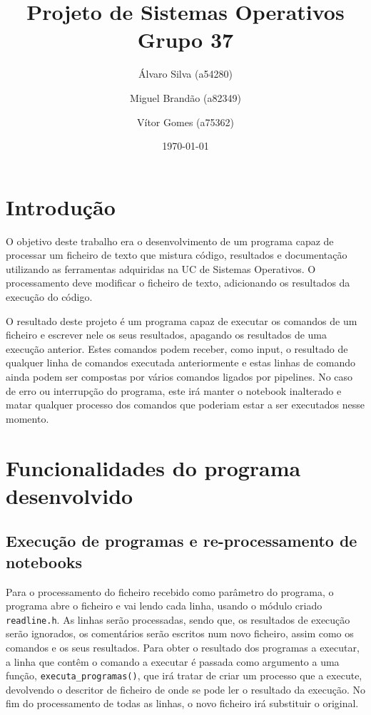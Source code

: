 \documentclass[a4paper]{article}
\title{Projeto de Sistemas Operativos\\Grupo 37}
\author{Álvaro Silva (a54280) \and Miguel Brandão (a82349) \and Vítor Gomes (a75362)}
\date{\today}
\begin{document}
\maketitle


\tableofcontents

\section{Introdução}
\label{sec:intro}

O objetivo deste trabalho era o desenvolvimento de um programa capaz de processar um ficheiro de texto que mistura código, resultados e documentação utilizando as ferramentas adquiridas na UC de Sistemas Operativos. O processamento deve modificar o ficheiro de texto, adicionando os resultados da execução do código.

O resultado deste projeto é um programa capaz de executar os comandos de um ficheiro e escrever nele os seus resultados, apagando os resultados de uma execução anterior. Estes comandos podem receber, como input, o resultado de qualquer linha de comandos executada anteriormente e estas linhas de comando ainda podem ser compostas por vários comandos ligados por pipelines. No caso de erro ou interrupção do programa, este irá manter o notebook inalterado e matar qualquer processo dos comandos que poderiam estar a ser executados nesse momento.

\section{Funcionalidades do programa desenvolvido}
\label{sec:func}


\subsection{Execução de programas e re-processamento de notebooks}

Para o processamento do ficheiro recebido como parâmetro do programa, o programa abre o ficheiro e vai lendo cada linha, usando o módulo criado \texttt{readline.h}. As linhas serão processadas, sendo que, os resultados de execução serão ignorados, os comentários serão escritos num novo ficheiro, assim como os comandos e os seus resultados.
Para obter o resultado dos programas a executar, a linha que contêm o comando a executar é passada como argumento a uma função, \texttt{executa\_programas()}, que irá tratar de criar um processo que a execute, devolvendo o descritor de ficheiro de onde se pode ler o resultado da execução.
No fim do processamento de todas as linhas, o novo ficheiro irá substituir o original.
\end{document}
